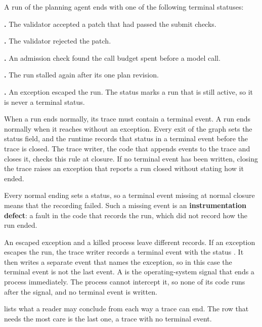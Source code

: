 A run of the planning agent ends with one of the following terminal statuses:
\bi
\item \textbf{.} The validator accepted a patch that had passed the submit checks.
\item \textbf{.} The validator rejected the patch.
\item \textbf{.} An admission check found the call budget spent before a
model call.
\item \textbf{.} The run stalled again after its one plan revision.
\item \textbf{.} An exception escaped the run.
\ei
The status  marks a run that is still active, so it is never a terminal status.

When a run ends normally, its trace must contain a terminal event. A run ends normally when it
reaches  without an exception. Every exit of the graph sets the status field, and the
runtime records that status in a terminal event before the trace is closed. The trace writer, the
code that appends events to the trace and closes it, checks this rule at closure. If no terminal
event has been written, closing the trace raises an exception that reports a run closed without
stating how it ended.

Every normal ending sets a status, so a terminal event missing at normal closure means that the
recording failed. Such a missing event is an \textbf{instrumentation defect}: a fault in the code
that records the run, which did not record how the run ended.

An escaped exception and a killed process leave different records. If an exception escapes the run,
the trace writer records a terminal event with the status . It then writes a separate
 event that names the exception, so in this case the terminal event is not
the last event. A
 is the operating-system signal that ends a process immediately. The process cannot
intercept it, so none of its code runs after the signal, and no terminal event is written.

 lists what a reader may conclude from each way a trace can end. The row that
needs the most care is the last one, a trace with no terminal event.

